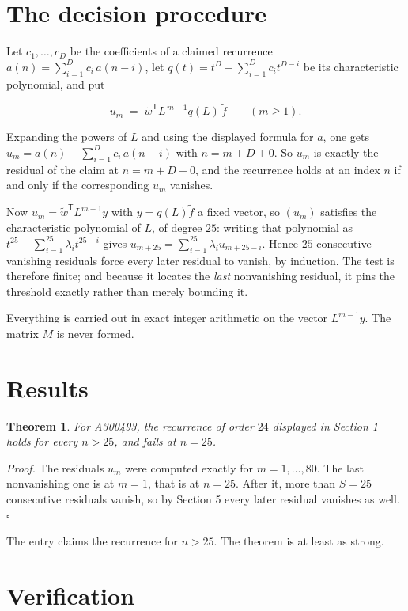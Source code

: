 \documentclass[11pt]{article}
\newtheorem{theorem}{Theorem}
\theoremstyle{definition}
\begin{document}
\section{The decision procedure}

Let $c_1,\dots,c_D$ be the coefficients of a claimed recurrence $a(n) = \sum_{i=1}^{D} c_i\,a(n-i)$, let $q(t) = t^{D} - \sum_{i=1}^{D} c_i t^{D-i}$ be its characteristic polynomial, and put

\[u_m \;=\; \tilde w^{\mathsf T} L^{\,m-1} q(L)\,\tilde f \qquad (m \ge 1).\]

Expanding the powers of $L$ and using the displayed formula for $a$, one gets $u_m = a(n) - \sum_{i=1}^{D} c_i\,a(n-i)$ with $n = m + D + 0$. So $u_m$ is exactly the residual of the claim at $n = m + D + 0$, and the recurrence holds at an index $n$ if and only if the corresponding $u_m$ vanishes.

Now $u_m = \tilde w^{\mathsf T} L^{m-1} y$ with $y = q(L)\tilde f$ a fixed vector, so $(u_m)$ satisfies the characteristic polynomial of $L$, of degree $25$: writing that polynomial as $t^{25} - \sum_{i=1}^{25} \lambda_i t^{25-i}$ gives $u_{m+25} = \sum_{i=1}^{25} \lambda_i u_{m+25-i}$. Hence $25$ consecutive vanishing residuals force every later residual to vanish, by induction. The test is therefore finite; and because it locates the {\itshape last} nonvanishing residual, it pins the threshold exactly rather than merely bounding it.

Everything is carried out in exact integer arithmetic on the vector $L^{m-1}y$. The matrix $M$ is never formed.

\section{Results}

\begin{theorem} For A300493, the recurrence of order $24$ displayed in Section 1 holds for every $n > 25$, and fails at $n = 25$.\end{theorem}

{\itshape Proof.} The residuals $u_m$ were computed exactly for $m = 1,\dots,80$. The last nonvanishing one is at $m = 1$, that is at $n = 25$. After it, more than $S = 25$ consecutive residuals vanish, so by Section 5 every later residual vanishes as well. $\square$

The entry claims the recurrence for $n > 25$. The theorem is at least as strong.

\section{Verification}
\end{document}
